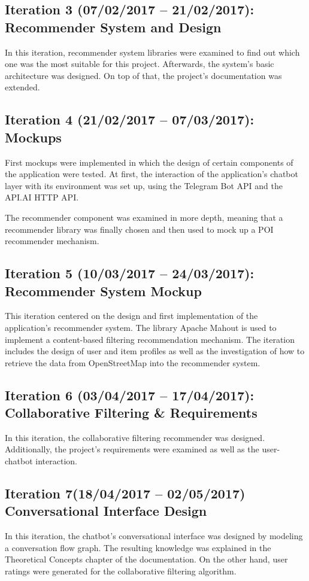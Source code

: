 \subsection{Iteration 3 (07/02/2017 – 21/02/2017): Recommender System and Design}
In this iteration, recommender system libraries were examined to find out which one was the most suitable for this project. Afterwards, the system's basic architecture was designed. On top of that, the project's documentation was extended.

\subsection{Iteration 4 (21/02/2017 – 07/03/2017): Mockups}
First mockups were implemented in which the design of certain components of the application were tested. At first, the interaction of the application's chatbot layer with its environment was set up, using the Telegram Bot API and the API.AI HTTP API.

The recommender component was examined in more depth, meaning that a recommender library was finally chosen and then used to mock up a POI recommender mechanism.

\subsection{Iteration 5 (10/03/2017 – 24/03/2017): Recommender System Mockup}
This iteration centered on the design and first implementation of the application's recommender system. The library Apache Mahout is used to implement a content-based filtering recommendation mechanism. The iteration includes the design of user and item profiles as well as the investigation of how to retrieve the data from OpenStreetMap into the recommender system.

\subsection{Iteration 6 (03/04/2017 – 17/04/2017): Collaborative Filtering \& Requirements}
In this iteration, the collaborative filtering recommender was designed. Additionally, the project's requirements were examined as well as the user-chatbot interaction.

\subsection{Iteration 7(18/04/2017 – 02/05/2017) Conversational Interface Design}
In this iteration, the chatbot's conversational interface was designed by modeling a conversation flow graph. The resulting knowledge was explained in the Theoretical Concepts chapter of the documentation. On the other hand, user ratings were generated for the collaborative filtering algorithm.

